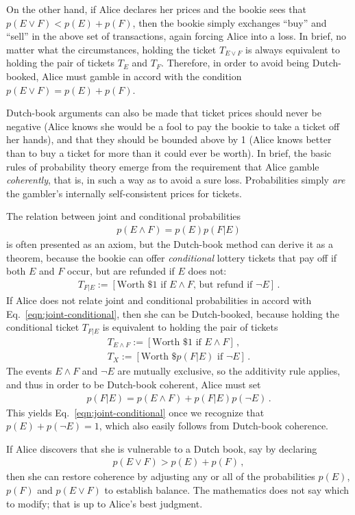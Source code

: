 \documentclass[%
 reprint,superscriptaddress,
 amsmath,amssymb,
 aps,pra, onecolumn, 12pt
]{revtex4-2}
\newcommand{\eqn}[1]{\begin{eqnarray} #1 \end{eqnarray}}
\newcommand{\tit}[1]{\textit{#1}}
\newcommand{\trm}[1]{\textrm{#1}}
\begin{document}
On the other hand, if Alice declares her prices and the bookie sees that $p(E \lor F) < p(E) + p(F)$, then the bookie simply exchanges ``buy'' and ``sell'' in the above set of transactions, again forcing Alice into a loss. In brief, no matter what the circumstances, holding the ticket $T_{E\lor F}$ is always equivalent to holding the pair of tickets $T_E$ and $T_F$. Therefore, in order to avoid being Dutch-booked, Alice must gamble in accord with the condition $p(E \lor F) = p(E) + p(F)$.

Dutch-book arguments can also be made that ticket prices should never be negative (Alice knows she would be a fool to pay the bookie to take a ticket off her hands), and that they should be bounded above by 1 (Alice knows better than to buy a ticket for more than it could ever be worth). In brief, the basic rules of probability theory emerge from the requirement that Alice gamble \tit{coherently}, that is, in such a way as to avoid a sure loss. Probabilities simply \tit{are} the gambler's internally self-consistent prices for tickets.

The relation between joint and conditional probabilities
\eqn{
  p(E \land F) = p(E)p(F|E)
  \label{eqn:joint-conditional}
}
is often presented as an axiom, but the Dutch-book method can derive it as a theorem, because the bookie can offer \tit{conditional} lottery tickets that pay off if both $E$ and $F$ occur, but are refunded if $E$ does not:
\eqn{
  T_{F|E} := [ \trm{Worth \$1 if $E \land F$, but refund if $\neg E$} ] \, .
}
If Alice does not relate joint and conditional probabilities in accord with Eq.\ \eqref{eqn:joint-conditional}, then she can be Dutch-booked, because holding the conditional ticket $T_{F|E}$ is equivalent to holding the pair of tickets
\eqn{
  T_{E \land F} := [\trm{Worth \$1 if $E \land F$}] \, , \nonumber\\
  T_{X} := [\trm{Worth \$$p(F|E)$ if $\neg E$}] \, .
}
The events $E \land F$ and $\neg E$ are mutually exclusive, so the additivity rule applies, and thus in order to be Dutch-book coherent, Alice must set
\eqn{
  p(F|E) = p(E \land F) + p(F|E)p(\neg E) \, .
}
This yields Eq.\ \eqref{eqn:joint-conditional} once we recognize that $p(E) + p(\neg E) = 1$, which also easily follows from Dutch-book coherence.

If Alice discovers that she is vulnerable to a Dutch book, say by declaring
\eqn{
  p(E \lor F) > p(E) + p(F) \, ,
}
then she can restore coherence by adjusting any or all of the probabilities $p(E)$, $p(F)$ and $p(E \lor F)$ to establish balance. The mathematics does not say which to modify; that is up to Alice's best judgment.
\end{document}
